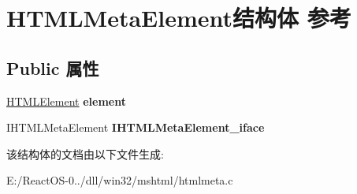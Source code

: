 \hypertarget{struct_h_t_m_l_meta_element}{}\section{H\+T\+M\+L\+Meta\+Element结构体 参考}
\label{struct_h_t_m_l_meta_element}
\subsection*{Public 属性}
\begin{DoxyCompactItemize}
\item 
\mbox{\label{struct_h_t_m_l_meta_element_a151d6f68274d5fb96ce722bc75b75838}} 
\hyperlink{struct_h_t_m_l_element}{H\+T\+M\+L\+Element} {\bfseries element}
\item 
\mbox{\label{struct_h_t_m_l_meta_element_ad989a3282e43cb6c992851bfa2749086}} 
I\+H\+T\+M\+L\+Meta\+Element {\bfseries I\+H\+T\+M\+L\+Meta\+Element\+\_\+iface}
\end{DoxyCompactItemize}


该结构体的文档由以下文件生成\+:\begin{DoxyCompactItemize}
\item 
E\+:/\+React\+O\+S-\/0../dll/win32/mshtml/htmlmeta.\+c\end{DoxyCompactItemize}

